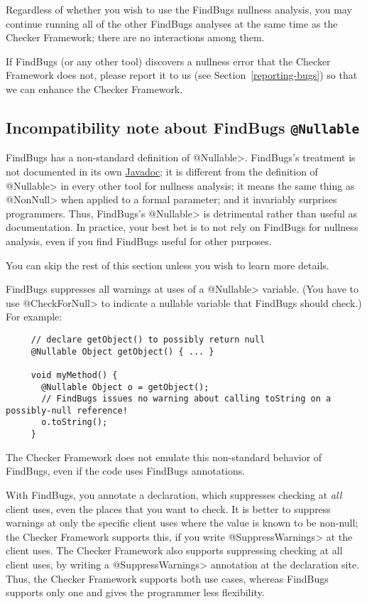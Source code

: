 Regardless of whether you wish to use the FindBugs nullness analysis, you
may continue running all of the other FindBugs analyses at the same time as
the Checker Framework; there are no interactions among them.

If FindBugs (or any other tool) discovers a nullness error that the Checker
Framework does not, please report it to us (see
Section~\ref{reporting-bugs}) so that we can enhance the Checker Framework.



\subsection{Incompatibility note about FindBugs \tt{@Nullable}\label{findbugs-nullable}}

FindBugs has a non-standard definition of \<@Nullable>.  FindBugs's treatment is not
documented in its own
\href{http://findbugs.sourceforge.net/api/edu/umd/cs/findbugs/annotations/Nullable.html}{Javadoc};
it is different from the definition of \<@Nullable> in every other tool for
nullness analysis; it means the same thing as \<@NonNull> when applied to a
formal parameter; and it invariably surprises programmers.  Thus, FindBugs's
\<@Nullable> is detrimental rather than useful as documentation.
In practice, your best bet is to not rely on FindBugs for nullness analysis,
even if you find FindBugs useful for other purposes.

You can skip the rest of this section unless you wish to learn more details.

FindBugs suppresses all warnings at uses of a \<@Nullable> variable.
(You have to use \<@CheckForNull> to
indicate a nullable variable that FindBugs should check.)  For example:

\begin{Verbatim}
     // declare getObject() to possibly return null
     @Nullable Object getObject() { ... }

     void myMethod() {
       @Nullable Object o = getObject();
       // FindBugs issues no warning about calling toString on a possibly-null reference!
       o.toString();
     }
\end{Verbatim}

\noindent
The Checker Framework does not emulate this non-standard behavior of
FindBugs, even if the code uses FindBugs annotations.

With FindBugs, you annotate a declaration, which suppresses checking at
\emph{all} client uses, even the places that you want to check.
It is better to suppress warnings at only the specific client uses
where the value is known to be non-null; the Checker Framework supports
this, if you write \<@SuppressWarnings> at the client uses.
The Checker Framework also supports suppressing checking at all client uses,
by writing a \<@SuppressWarnings> annotation at the declaration site.
Thus, the Checker Framework supports both use cases, whereas FindBugs
supports only one and gives the programmer less flexibility.

